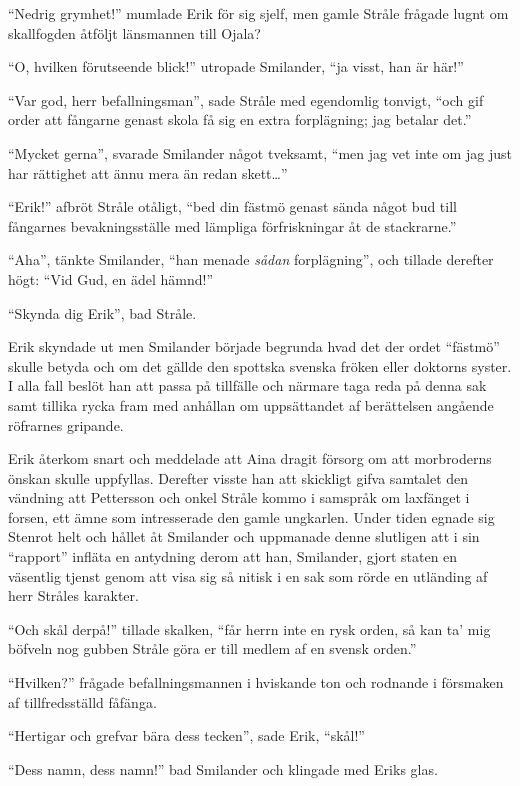 ``Nedrig grymhet!'' mumlade Erik för sig sjelf, men gamle Stråle frågade
lugnt om skallfogden åtföljt länsmannen till Ojala?

``O, hvilken förutseende blick!'' utropade Smilander, ``ja visst, han är
här!''

``Var god, herr befallningsman'', sade Stråle med egendomlig tonvigt,
``och gif order att fångarne genast skola få sig en extra forplägning;
jag betalar det.''

``Mycket gerna'', svarade Smilander något tveksamt, ``men jag vet inte
om jag just har rättighet att ännu mera än redan skett\ldots{}''

``Erik!'' afbröt Stråle otåligt, ``bed din fästmö genast sända något bud
till fångarnes bevakningsställe med lämpliga förfriskningar åt de
stackrarne.''

``Aha'', tänkte Smilander, ``han menade \emph{sådan} forplägning'', och
tillade derefter högt: ``Vid Gud, en ädel hämnd!''

``Skynda dig Erik'', bad Stråle.

Erik skyndade ut men Smilander började begrunda hvad det der ordet
``fästmö'' skulle betyda och om det gällde den spottska svenska fröken
eller doktorns syster. I alla fall beslöt han att passa på tillfälle och
närmare taga reda på denna sak samt tillika rycka fram med anhållan om
uppsättandet af berättelsen angående röfrarnes gripande.

Erik återkom snart och meddelade att Aina dragit försorg om att
morbroderns önskan skulle uppfyllas. Derefter visste han att skickligt
gifva samtalet den vändning att Pettersson och onkel Stråle kommo i
samspråk om laxfänget i forsen, ett ämne som intresserade den gamle
ungkarlen. Under tiden egnade sig Stenrot helt och hållet åt Smilander
och uppmanade denne slutligen att i sin ``rapport'' infläta en antydning
derom att han, Smilander, gjort staten en väsentlig tjenst genom att
visa sig så nitisk i en sak som rörde en utländing af herr Stråles
karakter.

``Och skål derpå!'' tillade skalken, ``får herrn inte en rysk orden, så
kan ta' mig böfveln nog gubben Stråle göra er till medlem af en svensk
orden.''

``Hvilken?'' frågade befallningsmannen i hviskande ton och rodnande i
försmaken af tillfredsställd fåfänga.

``Hertigar och grefvar bära dess tecken'', sade Erik, ``skål!''

``Dess namn, dess namn!'' bad Smilander och klingade med Eriks glas.

